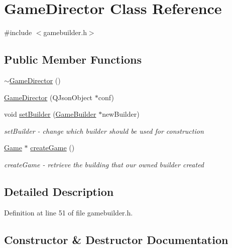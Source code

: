 \hypertarget{class_game_director}{}\section{Game\+Director Class Reference}
\label{class_game_director}


{\ttfamily \#include $<$gamebuilder.\+h$>$}

\subsection*{Public Member Functions}
\begin{DoxyCompactItemize}
\item 
\mbox{\hyperlink{class_game_director_a33c93c8581be00967a3d6cf4ce5bc9aa}{$\sim$\+Game\+Director}} ()
\item 
\mbox{\hyperlink{class_game_director_a3ac974d917a3cff7a7873bcf9bbfc2ce}{Game\+Director}} (Q\+Json\+Object $\ast$conf)
\item 
void \mbox{\hyperlink{class_game_director_af849b0b8309680e7eb53cc1803895aab}{set\+Builder}} (\mbox{\hyperlink{class_game_builder}{Game\+Builder}} $\ast$new\+Builder)
\begin{DoxyCompactList}\small\item\em set\+Builder -\/ change which builder should be used for construction \end{DoxyCompactList}\item 
\mbox{\hyperlink{class_game}{Game}} $\ast$ \mbox{\hyperlink{class_game_director_a39ad3747cf1b3bf8a6e335167f73d04b}{create\+Game}} ()
\begin{DoxyCompactList}\small\item\em create\+Game -\/ retrieve the building that our owned builder created \end{DoxyCompactList}\end{DoxyCompactItemize}


\subsection{Detailed Description}


Definition at line 51 of file gamebuilder.\+h.



\subsection{Constructor \& Destructor Documentation}
\mbox{\label{class_game_director_a33c93c8581be00967a3d6cf4ce5bc9aa}} 
